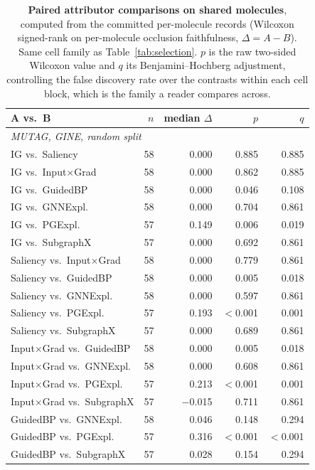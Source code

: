 \begin{table}[t]
\centering
\caption{\textbf{Paired attributor comparisons on shared molecules}, computed from the committed per-molecule records (Wilcoxon signed-rank on per-molecule occlusion faithfulness, $\Delta = A - B$). Same cell family as Table~\ref{tab:selection}. $p$ is the raw two-sided Wilcoxon value and $q$ its Benjamini--Hochberg adjustment, controlling the false discovery rate over the contrasts within each cell block, which is the family a reader compares across.}
\label{tab:paired}
\footnotesize
\renewcommand{\arraystretch}{1.2}
\begin{tabular}{lrrrr}
\toprule
\textbf{A vs.\ B} & \textbf{$n$} & \textbf{median $\Delta$} & \textbf{$p$} & \textbf{$q$} \\
\midrule
\multicolumn{5}{l}{\itshape MUTAG, GINE, random split} \\
\addlinespace[1pt]
IG vs.\ Saliency & 58 & 0.000 & 0.885 & 0.885 \\
IG vs.\ Input$\times$Grad & 58 & 0.000 & 0.862 & 0.885 \\
IG vs.\ GuidedBP & 58 & 0.000 & 0.046 & 0.108 \\
IG vs.\ GNNExpl. & 58 & 0.000 & 0.704 & 0.861 \\
IG vs.\ PGExpl. & 57 & 0.149 & 0.006 & 0.019 \\
IG vs.\ SubgraphX & 57 & 0.000 & 0.692 & 0.861 \\
Saliency vs.\ Input$\times$Grad & 58 & 0.000 & 0.779 & 0.861 \\
Saliency vs.\ GuidedBP & 58 & 0.000 & 0.005 & 0.018 \\
Saliency vs.\ GNNExpl. & 58 & 0.000 & 0.597 & 0.861 \\
Saliency vs.\ PGExpl. & 57 & 0.193 & $<$0.001 & 0.001 \\
Saliency vs.\ SubgraphX & 57 & 0.000 & 0.689 & 0.861 \\
Input$\times$Grad vs.\ GuidedBP & 58 & 0.000 & 0.005 & 0.018 \\
Input$\times$Grad vs.\ GNNExpl. & 58 & 0.000 & 0.608 & 0.861 \\
Input$\times$Grad vs.\ PGExpl. & 57 & 0.213 & $<$0.001 & 0.001 \\
Input$\times$Grad vs.\ SubgraphX & 57 & $-$0.015 & 0.711 & 0.861 \\
GuidedBP vs.\ GNNExpl. & 58 & 0.046 & 0.148 & 0.294 \\
GuidedBP vs.\ PGExpl. & 57 & 0.316 & $<$0.001 & $<$0.001 \\
GuidedBP vs.\ SubgraphX & 57 & 0.028 & 0.154 & 0.294 \\

\end{tabular}
\end{table}

